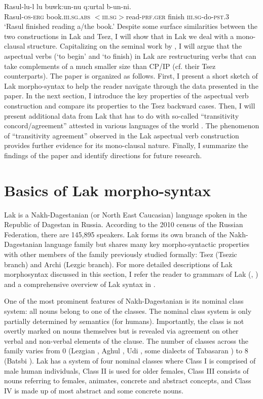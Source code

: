 \documentclass[output=paper]{langscibook}
\begin{document}
\ea\label{Rad3}
\gll Rasul-lu-l lu 	buwk:un-nu q:urtal b-un-ni.\\
Rasul-\textsc{os-erg} 		book.\textsc{iii.sg.abs} 	\textsc{$<$iii.sg$>$}read-\textsc{prf.ger}	finish 		\textsc{iii.sg}-do-\textsc{pst.3}\\
\glt ‘Rasul finished reading a/the book.’
\z
Despite some surface similarities between the two constructions in Lak and Tsez, I will show that in Lak we deal with a mono-clausal structure. Capitalizing on the seminal work by \citet{wurmbrand2001,Wurmbrand2004,Wurmbrand2007}, I will argue that the aspectual verbs (‘to begin’ and ‘to finish) in Lak are restructuring verbs that can take complements of a much smaller size than CP/IP (cf. their Tsez counterparts).
The paper is organized as follows. First, I present a short sketch of Lak morpho-syntax to help the reader navigate through the data presented in the paper. In the next section, I introduce the key properties of the aspectual verb construction and compare its properties to the Tsez backward cases. Then, I will present additional data from Lak that has to do with so-called “transitivity concord/agreement” attested in various languages of the world \citep{Zariquiey2014}. The phenomenon of “transitivity agreement” observed in the Lak aspectual verb construction provides further evidence for its mono-clausal nature. Finally, I summarize the findings of the paper and identify directions for future research.

\section{Basics of Lak morpho-syntax}\label{Radsect2}
Lak is a Nakh-Dagestanian (or North East Caucasian) language spoken in the Republic of Dagestan in Russia. According to the 2010 census of the Russian Federation, there are 145,895 speakers. Lak forms its own branch of the Nakh-Dagestanian language family but shares many key morpho-syntactic properties with other members of the family previously studied formally: Tsez (Tsezic branch) and Archi (Lezgic branch). For more detailed descriptions of Lak morphosyntax discussed in this section, I refer the reader to  grammars of Lak (\citealt{Zhirkov1955}, \citealt{Murkelinskij1971}) and a comprehensive overview of Lak syntax in \citet{Kazenin2013}.

One of the most prominent features of Nakh-Dagestanian is its nominal class system: all nouns belong to one of the classes. The nominal class system is only partially determined by semantics (for humans). Importantly, the class is not overtly marked on nouns themselves but is revealed via agreement on other verbal and non-verbal elements of the clause. The number of classes across the family varies from 0 (Lezgian \citep{Haspelmath1993}, Aghul \citep{Magometov1970}, Udi \citep{Harris2002}, some dialects of Tabasaran \citep{Magometov1965}) to 8 (Batsbi \citep{Desheriev1967}). Lak has a system of four nominal classes where Class I is comprised of male human individuals, Class II is used for older females, Class III consists of nouns referring to females, animates, concrete and abstract concepts, and Class IV is made up of most abstract and some concrete nouns.
\end{document}
